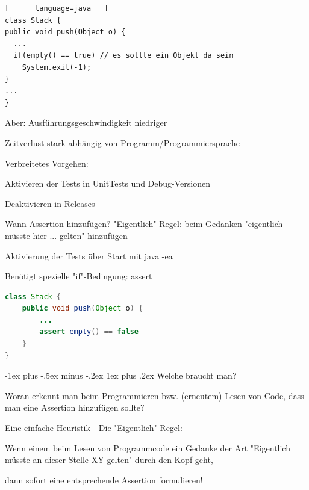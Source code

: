 \documentclass[10pt]{article}
\makeatletter
\renewcommand{\subsubsection}{\@startsection{subsubsection}{3}{0mm}%
                                {-1ex plus -.5ex minus -.2ex}%
                                {1ex plus .2ex}%
                                {\normalfont\small\bfseries}}
\makeatother
\begin{document}
\begin{lstlisting}[      language=java   ]
class Stack {
public void push(Object o) {
  ...
  if(empty() == true) // es sollte ein Objekt da sein
    System.exit(-1);
}
...
}
\end{lstlisting}

Aber: Ausführungsgeschwindigkeit niedriger
\begin{itemize*}
  \item Zeitverlust stark abhängig von Programm/Programmiersprache
  \item Verbreitetes Vorgehen:
  \begin{itemize*}
    \item Aktivieren der Tests in UnitTests und Debug-Versionen
    \item Deaktivieren in Releases
  \end{itemize*}
  \item Wann Assertion hinzufügen? "Eigentlich"-Regel: beim Gedanken "eigentlich müsste hier ... gelten" hinzufügen
  \item Aktivierung der Tests über Start mit java -ea
  \item Benötigt spezielle "if"-Bedingung: assert
\end{itemize*}
\begin{lstlisting}[language=java]
class Stack {
    public void push(Object o) {
        ...
        assert empty() == false
    }
}
\end{lstlisting}

\subsubsection{Welche braucht man?}
\begin{itemize*}
  \item Woran erkennt man beim Programmieren bzw. (erneutem) Lesen von Code, dass man eine Assertion hinzufügen sollte?
  \item Eine einfache Heuristik - Die "Eigentlich"-Regel:
  \begin{itemize*}
    \item Wenn einem beim Lesen von Programmcode ein Gedanke der Art "Eigentlich müsste an dieser Stelle XY gelten" durch den Kopf geht,
    \item dann sofort eine entsprechende Assertion formulieren!
  \end{itemize*}
\end{itemize*}
\end{document}
